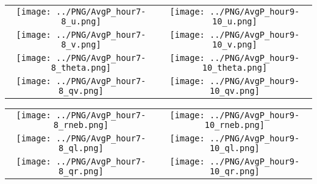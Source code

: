 \documentclass{article}
\begin{document}
\newpage

\begin{table}
  \begin{tabular}{cc}
     \texttt{[image: ../PNG/AvgP\_hour7-8\_u.png]}     & \texttt{[image: ../PNG/AvgP\_hour9-10\_u.png]}     \\
     \texttt{[image: ../PNG/AvgP\_hour7-8\_v.png]}     & \texttt{[image: ../PNG/AvgP\_hour9-10\_v.png]}     \\
     \texttt{[image: ../PNG/AvgP\_hour7-8\_theta.png]} & \texttt{[image: ../PNG/AvgP\_hour9-10\_theta.png]} \\
     \texttt{[image: ../PNG/AvgP\_hour7-8\_qv.png]}    & \texttt{[image: ../PNG/AvgP\_hour9-10\_qv.png]}
  \end{tabular}
\end{table}

\newpage

\begin{table}
  \begin{tabular}{cc}
     \texttt{[image: ../PNG/AvgP\_hour7-8\_rneb.png]} & \texttt{[image: ../PNG/AvgP\_hour9-10\_rneb.png]} \\
     \texttt{[image: ../PNG/AvgP\_hour7-8\_ql.png]}   & \texttt{[image: ../PNG/AvgP\_hour9-10\_ql.png]}  \\
     \texttt{[image: ../PNG/AvgP\_hour7-8\_qr.png]}   & \texttt{[image: ../PNG/AvgP\_hour9-10\_qr.png]}
  \end{tabular}
\end{table}

\newpage



\end{document}
